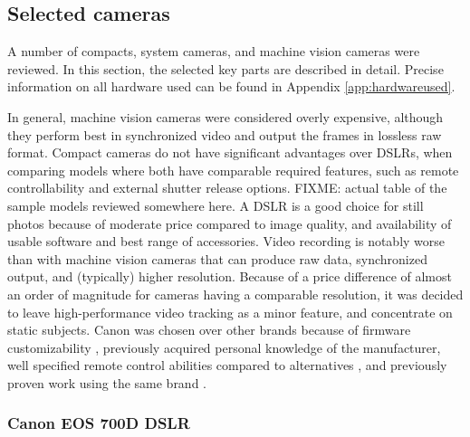 

\subsection{Selected cameras} %

A number of compacts, system cameras, and machine vision cameras were reviewed.
In this section, the selected key parts are described in detail.
Precise information on all hardware used can be found in Appendix \ref{app:hardwareused}.

In general, machine vision cameras were considered overly expensive, although they perform best in synchronized video and output the frames in lossless raw format.
Compact cameras do not have significant advantages over DSLRs, when comparing models where both have comparable required features, such as remote controllability and external shutter release options.
{ \color{red} FIXME: actual table of the sample models reviewed somewhere here. }
A DSLR is a good choice for still photos because of moderate price compared to image quality, and availability of usable software and best range of accessories.
Video recording is notably worse than with machine vision cameras that can produce raw data, synchronized output, and (typically) higher resolution.
Because of a price difference of almost an order of magnitude for cameras having a comparable resolution, it was decided to leave high-performance video tracking as a minor feature, and concentrate on static subjects.
Canon was chosen over other brands because of firmware customizability \cite{magiclantern}, previously acquired personal knowledge of the manufacturer, well specified remote control abilities compared to alternatives \cite{canonedsdk}, and previously proven work using the same brand \cite{ir-ltd,ten24,capturelab,agisoftforum}.

\subsubsection{Canon EOS 700D DSLR}


